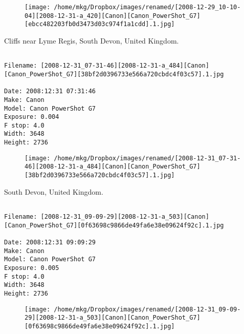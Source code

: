 \begin{figure}
\texttt{[image: /home/mkg/Dropbox/images/renamed/[2008-12-29\_10-10-04][2008-12-31-a\_420][Canon][Canon\_PowerShot\_G7][ebcc482203fb0d3473d03c974f1a1cdd].1.jpg]}
\end{figure}
    
\clearpage
\onecolumn
\noindent Cliffs near Lyme Regis, South Devon, United Kingdom.
\noindent
\begin{lstlisting}

Filename: [2008-12-31_07-31-46][2008-12-31-a_484][Canon][Canon_PowerShot_G7][38bf2d0396733e566a720cbdc4f03c57].1.jpg

Date: 2008:12:31 07:31:46
Make: Canon
Model: Canon PowerShot G7
Exposure: 0.004
F stop: 4.0
Width: 3648
Height: 2736
\end{lstlisting}
\clearpage

\begin{figure}
\texttt{[image: /home/mkg/Dropbox/images/renamed/[2008-12-31\_07-31-46][2008-12-31-a\_484][Canon][Canon\_PowerShot\_G7][38bf2d0396733e566a720cbdc4f03c57].1.jpg]}
\end{figure}
    
\clearpage
\onecolumn
\noindent South Devon, United Kingdom.
\noindent
\begin{lstlisting}

Filename: [2008-12-31_09-09-29][2008-12-31-a_503][Canon][Canon_PowerShot_G7][0f63698c9866de49fa6e38e09624f92c].1.jpg

Date: 2008:12:31 09:09:29
Make: Canon
Model: Canon PowerShot G7
Exposure: 0.005
F stop: 4.0
Width: 3648
Height: 2736
\end{lstlisting}
\clearpage

\begin{figure}
\texttt{[image: /home/mkg/Dropbox/images/renamed/[2008-12-31\_09-09-29][2008-12-31-a\_503][Canon][Canon\_PowerShot\_G7][0f63698c9866de49fa6e38e09624f92c].1.jpg]}
\end{figure}
    

